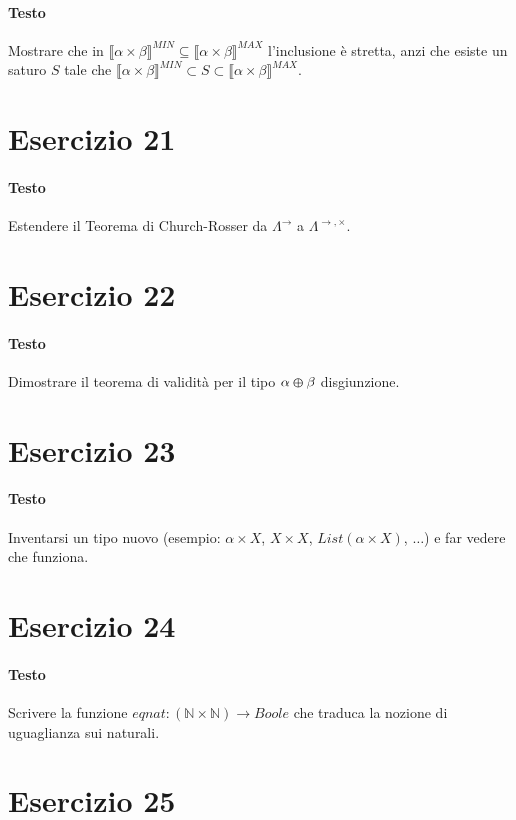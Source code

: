 \documentclass[a4paper,10pt]{article}
\begin{document}
\paragraph{Testo}
Mostrare che in $\llbracket \alpha \times \beta \rrbracket^{MIN} \subseteq \llbracket \alpha \times \beta \rrbracket^{MAX}$ l’inclusione è stretta, anzi che esiste un saturo $S$ tale che $\llbracket \alpha \times \beta \rrbracket^{MIN} \subset S \subset \llbracket \alpha \times \beta \rrbracket^{MAX}$.

\section*{Esercizio 21}
\paragraph{Testo}
Estendere il Teorema di Church-Rosser da $\Lambda^\rightarrow$ a $\Lambda^{\rightarrow, \times}$.

\section*{Esercizio 22}
\paragraph{Testo}
Dimostrare il teorema di validità per il tipo $\alpha \varoplus \beta$ disgiunzione.

\section*{Esercizio 23}
\paragraph{Testo}
Inventarsi un tipo nuovo (esempio: $\alpha \times X$, $X \times X$, $List(\alpha \times X)$, $\dots$) e far vedere che funziona.

\section*{Esercizio 24}
\paragraph{Testo}
Scrivere la funzione $eqnat : (\mathbb{N} \times \mathbb{N}) \rightarrow Boole$ che traduca la nozione di uguaglianza sui naturali.

\section*{Esercizio 25}
\end{document}

